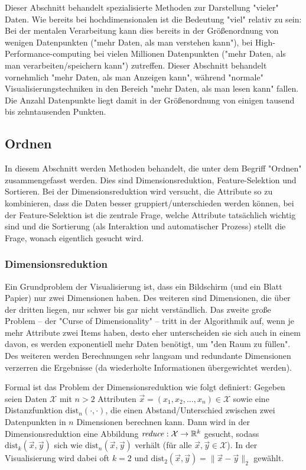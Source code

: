 		Dieser Abschnitt behandelt spezialisierte Methoden zur Darstellung "vieler" Daten. Wie bereits bei hochdimensionalen ist die Bedeutung "viel" relativ zu sein: Bei der mentalen Verarbeitung kann dies bereits in der Größenordnung von wenigen Datenpunkten ("mehr Daten, als man verstehen kann"), bei High-Performance-computing bei vielen Millionen Datenpunkten ("mehr Daten, als man verarbeiten/speichern kann") zutreffen. Dieser Abschnitt behandelt vornehmlich "mehr Daten, als man Anzeigen kann", während "normale" Visualisierungstechniken in den Bereich "mehr Daten, als man lesen kann" fallen. Die Anzahl Datenpunkte liegt damit in der Größenordnung von einigen tausend bis zehntausenden Punkten.

		\subsection{Ordnen}
			In diesem Abschnitt werden Methoden behandelt, die unter dem Begriff "Ordnen" zusammengefasst werden. Dies sind \bspw Dimensionsreduktion, Feature-Selektion und Sortieren. Bei der Dimensionsreduktion wird versucht, die Attribute so zu kombinieren, dass die Daten besser gruppiert/unterschieden werden können, bei der Feature-Selektion ist die zentrale Frage, welche Attribute tatsächlich wichtig sind und die Sortierung (als Interaktion und automatischer Prozess) stellt die Frage, wonach eigentlich gesucht wird.

			\subsubsection{Dimensionsreduktion}
				\label{subsubsec:dimred}

				Ein Grundproblem der Visualisierung ist, dass ein Bildschirm (und ein Blatt Papier) nur zwei Dimensionen haben. Des weiteren sind Dimensionen, die über der dritten liegen, nur schwer bis gar nicht verständlich. Das zweite große Problem -- der "Curse of Dimensionality" -- tritt in der Algorithmik auf, wenn je mehr Attribute zwei Items haben, desto eher unterscheiden sie sich auch in einem davon, \dh es werden exponentiell mehr Daten benötigt, um "den Raum zu füllen". Des weiteren werden Berechnungen sehr langsam und redundante Dimensionen verzerren die Ergebnisse (da wiederholte Informationen übergewichtet werden).

				Formal ist das Problem der Dimensionsreduktion wie folgt definiert: Gegeben seien Daten \( \mathcal{X} \) mit \(n > 2\) Attributen \( \vec{x} = (x_1, x_2, \dots, x_n) \in \mathcal{X} \) sowie eine Distanzfunktion \( \mathrm{dist}_n(\cdot, \cdot) \), die einen Abstand/Unterschied zwischen zwei Datenpunkten in \(n\) Dimensionen berechnen kann. Dann wird in der Dimensionsreduktion eine Abbildung \( \mathit{reduce} : \mathcal{X} \to \mathbb{R}^k \) gesucht, sodass \( \mathrm{dist}_k(\vec{x}, \vec{y}) \) sich wie \( \mathrm{dist}_n(\vec{x}, \vec{y}) \) verhält (für alle \( \vec{x}, \vec{y} \in \mathcal{X} \)). In der Visualisierung wird dabei oft \( k = 2 \) und \( \mathrm{dist}_2(\vec{x}, \vec{y}) = \lVert \vec{x} - \vec{y} \rVert_2 \) gewählt.

